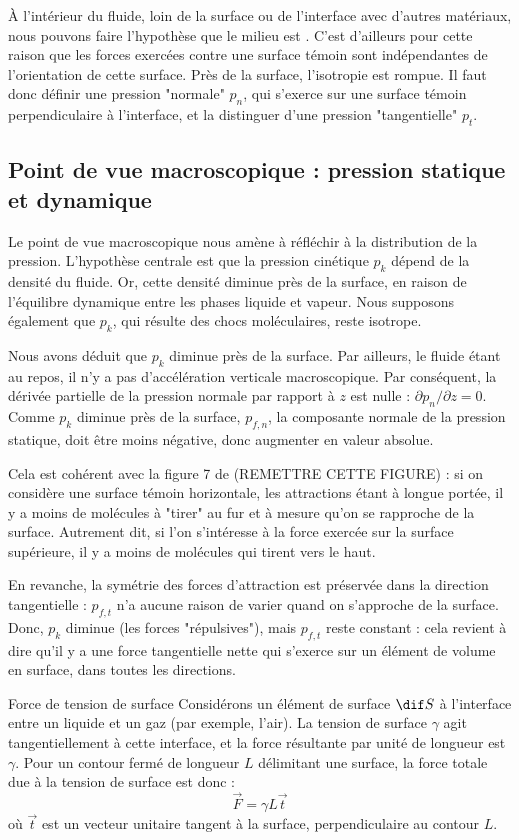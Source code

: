 À l'intérieur du fluide, loin de la surface ou de l'interface avec d'autres matériaux, nous pouvons faire l'hypothèse que le milieu est . C'est d'ailleurs pour cette raison que les forces exercées contre une surface témoin sont indépendantes de l'orientation de cette surface. Près de la surface, l'isotropie est rompue. Il faut donc définir une pression "normale" $p_n$, qui s'exerce sur une surface témoin perpendiculaire à l'interface, et la distinguer d'une pression "tangentielle" $p_t$.

\subsection{Point de vue macroscopique : pression statique et dynamique}
Le point de vue macroscopique nous amène à réfléchir à la distribution de la pression. L’hypothèse centrale est que la pression cinétique $p_k$ dépend de la densité du fluide. Or, cette densité diminue près de la surface, en raison de l’équilibre dynamique entre les phases liquide et vapeur. Nous supposons également que $p_k$, qui résulte des chocs moléculaires, reste isotrope.

Nous avons déduit que $p_k$ diminue près de la surface. Par ailleurs, le fluide étant au repos, il n’y a pas d’accélération verticale macroscopique. Par conséquent, la dérivée partielle de la pression normale par rapport à $z$ est nulle : $\partial p_n / \partial z = 0$. Comme $p_k$ diminue près de la surface, $p_{f,n}$, la composante normale de la pression statique, doit être moins négative, donc augmenter en valeur absolue.

Cela est cohérent avec la figure 7 de \cite{marchand11aa} (REMETTRE CETTE FIGURE) : si on considère une surface témoin horizontale, les attractions étant à longue portée, il y a moins de molécules à "tirer" au fur et à mesure qu'on se rapproche de la surface. Autrement dit, si l'on s'intéresse à la force exercée sur la surface supérieure, il y a moins de molécules qui tirent vers le haut.

En revanche, la symétrie des forces d'attraction est préservée dans la direction tangentielle : $p_{f,t}$ n'a aucune raison de varier quand on s'approche de la surface. Donc, $p_k$ diminue (les forces "répulsives"), mais $p_{f,t}$ reste constant : cela revient à dire qu'il y a une force tangentielle nette qui s'exerce sur un élément de volume en surface, dans toutes les directions.

\begin{key}{Force de tension de surface}
Considérons un élément de surface $\dif S$ à l'interface entre un liquide et un gaz (par exemple, l'air). La tension de surface $\gamma$ agit tangentiellement à cette interface, et la force résultante par unité de longueur est $\gamma$. Pour un contour fermé de longueur $L$ délimitant une surface, la force totale due à la tension de surface est donc :
\[
  \vec{F} = \gamma L \vec{t}
\]
où $\vec{t}$ est un vecteur unitaire tangent à la surface, perpendiculaire au contour $L$.

\end{key}

